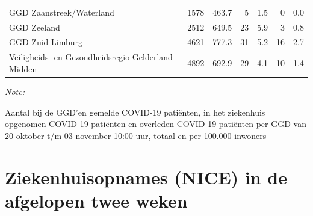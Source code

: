\documentclass[
  english,
  man,floatsintext]{apa6}
\begin{document}
\begin{table}
\begin{threeparttable}
\begin{tabular}{lrrrrrr}
GGD Zaanstreek/Waterland & 1578 & 463.7 & 5 & 1.5 & 0 & 0.0\\
GGD Zeeland & 2512 & 649.5 & 23 & 5.9 & 3 & 0.8\\
GGD Zuid-Limburg & 4621 & 777.3 & 31 & 5.2 & 16 & 2.7\\
Veiligheids- en Gezondheidsregio Gelderland-Midden & 4892 & 692.9 & 29 & 4.1 & 10 & 1.4\\
\bottomrule
\end{tabular}
\begin{tablenotes}
\item \textit{Note: } 
\item Aantal bij de GGD’en gemelde COVID-19 patiënten, in het ziekenhuis opgenomen COVID-19 patiënten en overleden COVID-19 patiënten per GGD van 20 oktober t/m 03 november 10:00 uur, totaal en per 100.000 inwoners
\end{tablenotes}
\end{threeparttable}
\endgroup{}
\end{table}

\newpage

\hypertarget{ziekenhuisopnames-nice-in-de-afgelopen-twee-weken}{%
\section{Ziekenhuisopnames (NICE) in de afgelopen twee weken}\label{ziekenhuisopnames-nice-in-de-afgelopen-twee-weken}}
\end{document}
